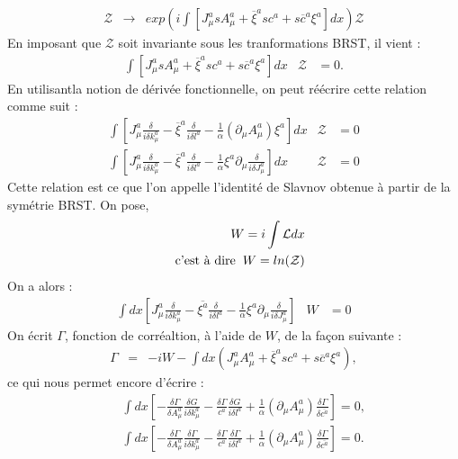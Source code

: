 \documentclass[a4paper,11pt]{article}
\theoremstyle{plain}
\theoremstyle{definition}
\theoremstyle{remark}
\numberwithin{equation}{section}
\numberwithin{equation}{subsection}
\numberwithin{figure}{section}
\begin{document}
\begin{eqnarray}
 \mathcal{Z} &\rightarrow&  exp \left( i \int \left[ J_{\mu}^{a} s A_{\mu}^{a} + \overline{\xi}^{a} s c^{a} + s \overline{c}^{a} \xi^{a} \right] dx \right)  \mathcal{Z}
\end{eqnarray}
En imposant que $\mathcal{Z}$ soit invariante sous les tranformations BRST, il vient :
\begin{eqnarray}
\int \left[ J_{\mu}^{a} s A_{\mu}^{a} + \overline{\xi}^{a} s c^{a} + s \overline{c}^{a} \xi^{a} \right] dx  & \mathcal{Z}&  = 0.
\end{eqnarray}
En utilisantla notion de dérivée fonctionnelle, on peut réécrire cette relation comme suit :
\begin{eqnarray}
\int \left[ J_{\mu}^{a} \frac{\delta}{i \delta k^{a}_{\mu} } - \overline{\xi}^{a} \frac{\delta}{i \delta l^{a} }  
- \frac{1}{\alpha} \left( \partial_{\mu} A_{\mu}^{a} \right) \xi^{a} \right] dx  & \mathcal{Z}&  = 0 \\
\int \left[ J_{\mu}^{a} \frac{\delta}{i \delta k^{a}_{\mu} } - \overline{\xi}^{a} \frac{\delta}{i \delta l^{a} }  
- \frac{1}{\alpha} \xi^{a}  \partial_{\mu} \frac{\delta}{i \delta J_{\mu}^{a} }  \right] dx  & \mathcal{Z}&  = 0
\end{eqnarray}
Cette relation est ce que l'on appelle l'identité de Slavnov obtenue à partir de la symétrie BRST. 
On pose,
\begin{eqnarray}
 && W = i \int \mathcal{L} dx  \nonumber  \\
 && \text{c'est à dire} \hspace{2mm} W = ln ( \mathcal{Z} ) 
\end{eqnarray}
On a alors :
\begin{eqnarray}
 \int dx \left[ J^{a}_{\mu} \frac{\delta}{i \delta k^{a}_{\mu}} - \overline{\xi^{a}} \frac{\delta}{i \delta l^{a}} - \frac{1}{\alpha} 
\xi^{a} \partial_{\mu} \frac{\delta}{i \delta J^{a}_{\mu}}\right] &W& =0
\end{eqnarray}
On écrit $\Gamma$, fonction de corréaltion, à l'aide de $W$, de la façon suivante :
\begin{eqnarray}
 \Gamma &=& -iW - \int dx \left(J_{\mu}^{a}A_{\mu}^{a} + \overline{\xi}^{a}sc^{a} + s\overline{c}^{a}\xi^{a} \right) ,
\end{eqnarray}
ce qui nous permet encore d'écrire :
\begin{eqnarray}
 && \int dx \left[ -\frac{\delta \Gamma}{\delta A^{a}_{\mu}} \frac{\delta G }{i \delta k^{a}_{\mu}} 
- \frac{\delta \Gamma}{c^{a}}\frac{\delta G}{i \delta l^{a}} 
+ \frac{1}{\alpha} \left( \partial_{\mu} A^{a}_{\mu} \right) \frac{\delta \Gamma}{\delta \overline{c^{a}}}\right] = 0 ,  \\
 && \int dx \left[ -\frac{\delta \Gamma}{\delta A^{a}_{\mu}} \frac{\delta \Gamma }{i \delta k^{a}_{\mu}} 
- \frac{\delta \Gamma}{c^{a}}\frac{\delta \Gamma}{i \delta l^{a}} 
+ \frac{1}{\alpha} \left( \partial_{\mu} A^{a}_{\mu} \right) \frac{\delta \Gamma}{\delta \overline{c^{a}}}\right] = 0 .
\end{eqnarray}
\end{document}
